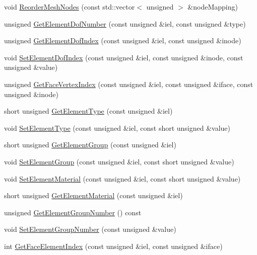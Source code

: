 \begin{DoxyCompactItemize}
void \mbox{\hyperlink{classfemus_1_1elem_a144e44d4d378fc7daea1e6bfd2aa4ac4}{Reorder\+Mesh\+Nodes}} (const std\+::vector$<$ unsigned $>$ \&node\+Mapping)
\item 
unsigned \mbox{\hyperlink{classfemus_1_1elem_aabfd00a1d57b475aec7a3c3622c82668}{Get\+Element\+Dof\+Number}} (const unsigned \&iel, const unsigned \&type)
\item 
unsigned \mbox{\hyperlink{classfemus_1_1elem_a77bb25f38a4ae2ee0a6e4d3edcf3ba56}{Get\+Element\+Dof\+Index}} (const unsigned \&iel, const unsigned \&inode)
\item 
void \mbox{\hyperlink{classfemus_1_1elem_acc9003e820ed0bcbf784e0910b911549}{Set\+Element\+Dof\+Index}} (const unsigned \&iel, const unsigned \&inode, const unsigned \&value)
\item 
unsigned \mbox{\hyperlink{classfemus_1_1elem_ab90990cb6e1f9a7bc421c69c72db9d55}{Get\+Face\+Vertex\+Index}} (const unsigned \&iel, const unsigned \&iface, const unsigned \&inode)
\item 
short unsigned \mbox{\hyperlink{classfemus_1_1elem_a9389fca6b346d241873c46d1f9357689}{Get\+Element\+Type}} (const unsigned \&iel)
\item 
void \mbox{\hyperlink{classfemus_1_1elem_a23cec6d31d533bfc2a387f4cf23dc763}{Set\+Element\+Type}} (const unsigned \&iel, const short unsigned \&value)
\item 
short unsigned \mbox{\hyperlink{classfemus_1_1elem_acdd8b9d5723e673a72c22f1f74e13d2b}{Get\+Element\+Group}} (const unsigned \&iel)
\item 
void \mbox{\hyperlink{classfemus_1_1elem_a950c41c56ffc7c95d951ef4649a45c5f}{Set\+Element\+Group}} (const unsigned \&iel, const short unsigned \&value)
\item 
void \mbox{\hyperlink{classfemus_1_1elem_a5a00f23f650334a2b35ab8808bb4f1e0}{Set\+Element\+Material}} (const unsigned \&iel, const short unsigned \&value)
\item 
short unsigned \mbox{\hyperlink{classfemus_1_1elem_a4f03cbc37f596624428ff2e6b4609094}{Get\+Element\+Material}} (const unsigned \&iel)
\item 
unsigned \mbox{\hyperlink{classfemus_1_1elem_afb7f045c1d2f85aa101ae7e7d8230a9c}{Get\+Element\+Group\+Number}} () const
\item 
void \mbox{\hyperlink{classfemus_1_1elem_a1485cf4c145f863dfadac833b51085b8}{Set\+Element\+Group\+Number}} (const unsigned \&value)
\item 
int \mbox{\hyperlink{classfemus_1_1elem_a491172d27d04d10ce166f42161d0c1d1}{Get\+Face\+Element\+Index}} (const unsigned \&iel, const unsigned \&iface)

\end{DoxyCompactItemize}
